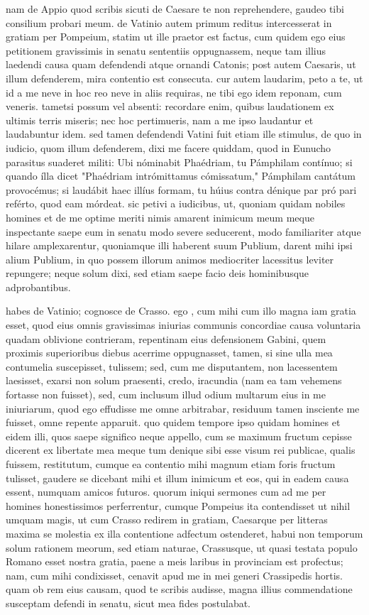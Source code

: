  nam de Appio quod scribis sicuti de Caesare te non reprehendere, gaudeo tibi consilium probari meum. de Vatinio autem primum reditus intercesserat in gratiam per Pompeium, statim ut ille praetor est factus, cum quidem ego eius petitionem gravissimis in senatu sententiis oppugnassem, neque tam illius laedendi causa quam defendendi atque ornandi Catonis; post autem Caesaris, ut illum defenderem, mira contentio est consecuta. cur autem laudarim, peto a te, ut id a me neve in hoc reo neve in aliis requiras, ne tibi ego idem reponam, cum veneris. tametsi possum vel absenti: recordare enim, quibus laudationem ex ultimis terris miseris; nec hoc pertimueris, nam a me ipso laudantur et laudabuntur idem. sed tamen defendendi Vatini fuit etiam ille stimulus, de quo in iudicio, quom illum defenderem, dixi me facere quiddam, quod in Eunucho parasitus suaderet militi: Ubi nóminabit Phaédriam, tu Pámphilam contínuo; si quando ílla dicet "Phaédriam intrómittamus cómissatum," Pámphilam cantátum provocémus; si laudábit haec illíus formam, tu húius contra dénique par pró pari reférto, quod eam mórdeat. sic petivi a iudicibus, ut, quoniam quidam nobiles homines et de me optime meriti nimis amarent inimicum meum meque inspectante saepe eum in senatu modo severe seducerent, modo familiariter atque hilare amplexarentur, quoniamque illi haberent suum Publium, darent mihi ipsi alium Publium, in quo possem illorum animos mediocriter lacessitus leviter repungere; neque solum dixi, sed etiam saepe facio deis hominibusque adprobantibus.

 habes de Vatinio; cognosce de Crasso. ego , cum mihi cum illo magna iam gratia esset, quod eius omnis gravissimas iniurias communis concordiae causa voluntaria quadam oblivione contrieram, repentinam eius defensionem Gabini, quem proximis superioribus diebus acerrime oppugnasset, tamen, si sine ulla mea contumelia suscepisset, tulissem; sed, cum me disputantem, non lacessentem laesisset, exarsi non solum praesenti, credo, iracundia (nam ea tam vehemens fortasse non fuisset), sed, cum inclusum illud odium multarum eius in me iniuriarum, quod ego effudisse me omne arbitrabar, residuum tamen insciente me fuisset, omne repente apparuit. quo quidem tempore ipso quidam homines et eidem illi, quos saepe significo neque appello, cum se maximum fructum cepisse dicerent ex libertate mea meque tum denique sibi esse visum rei publicae, qualis fuissem, restitutum, cumque ea contentio mihi magnum etiam foris fructum tulisset, gaudere se dicebant mihi et illum inimicum et eos, qui in eadem causa essent, numquam amicos futuros. quorum iniqui sermones cum ad me per homines honestissimos perferrentur, cumque Pompeius ita contendisset ut nihil umquam magis, ut cum Crasso redirem in gratiam, Caesarque per litteras maxima se molestia ex illa contentione adfectum ostenderet, habui non temporum solum rationem meorum, sed etiam naturae, Crassusque, ut quasi testata populo Romano esset nostra gratia, paene a meis laribus in provinciam est profectus; nam, cum mihi condixisset, cenavit apud me in mei generi Crassipedis hortis. quam ob rem eius causam, quod te scribis audisse, magna illius commendatione susceptam defendi in senatu, sicut mea fides postulabat.

